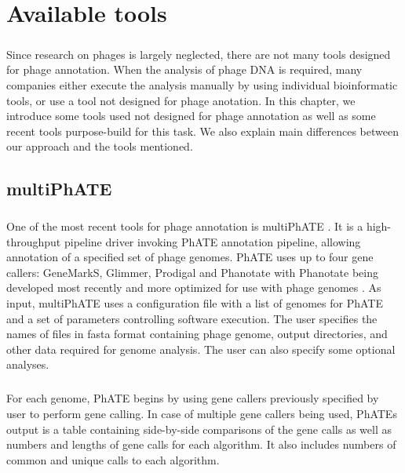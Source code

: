 \chapter{Available tools}

\label{kap:avtools} %
\paragraph*{}
Since research on phages is largely neglected, there are not many tools designed for phage annotation. When the analysis of phage DNA is required, many companies either execute the analysis manually by using individual bioinformatic tools, or use a tool not designed for phage anotation. In this chapter, we introduce some tools used not designed for phage annotation as well as some recent tools purpose-build for this task. We also explain main differences between our approach and the tools mentioned.
\section{multiPhATE}
\paragraph*{}
One of the most recent tools for phage annotation is multiPhATE \cite{10.1093/bioinformatics/btz258}. It is a high-throughput pipeline driver invoking PhATE annotation pipeline, allowing annotation of a specified set of phage genomes. PhATE uses up to four gene callers: GeneMarkS, Glimmer, Prodigal and Phanotate with Phanotate being developed most recently and more optimized for use with phage genomes \cite{10.1093/bioinformatics/btz265}.
As input, multiPhATE uses a configuration file with a list of genomes for PhATE and a set of parameters controlling software execution. The user specifies the names of files in fasta format containing phage genome, output directories, and other data required for genome analysis. The user can also specify some optional analyses.
\paragraph*{}
For each genome, PhATE begins by using gene callers previously specified by user to perform gene calling. In case of multiple gene callers being used, PhATEs output is a table containing side-by-side comparisons of the gene calls as well as numbers and lengths of gene calls for each algorithm. It also includes numbers of common and unique calls to each algorithm. 
